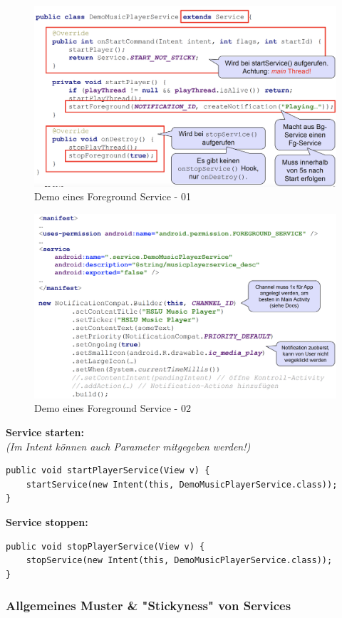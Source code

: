 \documentclass[a4paper]{article}
\begin{document}
		\begin{figure}[!htb]
			\centering
			\includegraphics[width=.8\textwidth]{img/service_demo01.png}
			\caption{Demo eines Foreground Service - 01}
			\label{fig:service_demo_01}
		\end{figure}
	
		\begin{figure}[!htb]
			\centering
			\includegraphics[width=.8\textwidth]{img/service_demo02.png}
			\caption{Demo eines Foreground Service - 02}
			\label{fig:service_demo_02}
		\end{figure}
		
		\newpage
		\noindent
		\textbf{Service starten:}\\
		\textit{(Im Intent können auch Parameter mitgegeben werden!)}
		\begin{lstlisting}
public void startPlayerService(View v) { 
	startService(new Intent(this, DemoMusicPlayerService.class)); 
}
		\end{lstlisting}
		\textbf{Service stoppen:}
		\begin{lstlisting}
public void stopPlayerService(View v) { 
	stopService(new Intent(this, DemoMusicPlayerService.class)); 
}
		\end{lstlisting}
		
		\subsubsection{Allgemeines Muster \& "Stickyness" von Services}
		
\end{document}
